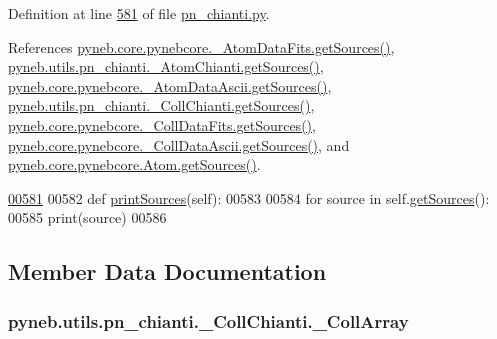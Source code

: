 Definition at line \hyperlink{pn__chianti_8py_source_l00581}{581} of file \hyperlink{pn__chianti_8py_source}{pn\-\_\-chianti.\-py}.



References \hyperlink{pynebcore_8py_source_l00190}{pyneb.\-core.\-pynebcore.\-\_\-\-Atom\-Data\-Fits.\-get\-Sources()}, \hyperlink{pn__chianti_8py_source_l00393}{pyneb.\-utils.\-pn\-\_\-chianti.\-\_\-\-Atom\-Chianti.\-get\-Sources()}, \hyperlink{pynebcore_8py_source_l00460}{pyneb.\-core.\-pynebcore.\-\_\-\-Atom\-Data\-Ascii.\-get\-Sources()}, \hyperlink{pn__chianti_8py_source_l00570}{pyneb.\-utils.\-pn\-\_\-chianti.\-\_\-\-Coll\-Chianti.\-get\-Sources()}, \hyperlink{pynebcore_8py_source_l00690}{pyneb.\-core.\-pynebcore.\-\_\-\-Coll\-Data\-Fits.\-get\-Sources()}, \hyperlink{pynebcore_8py_source_l01022}{pyneb.\-core.\-pynebcore.\-\_\-\-Coll\-Data\-Ascii.\-get\-Sources()}, and \hyperlink{pynebcore_8py_source_l01516}{pyneb.\-core.\-pynebcore.\-Atom.\-get\-Sources()}.


\begin{DoxyCode}
\hypertarget{classpyneb_1_1utils_1_1pn__chianti_1_1___coll_chianti_l00581}{}\hyperlink{classpyneb_1_1utils_1_1pn__chianti_1_1___coll_chianti_ab6061090f17fd6a1122281157459ec7c}{00581} 
00582     \textcolor{keyword}{def }\hyperlink{classpyneb_1_1utils_1_1pn__chianti_1_1___coll_chianti_ab6061090f17fd6a1122281157459ec7c}{printSources}(self):
00583         
00584         \textcolor{keywordflow}{for} source \textcolor{keywordflow}{in} self.\hyperlink{classpyneb_1_1utils_1_1pn__chianti_1_1___coll_chianti_ad4ee6409d1b66c4f0fde4aa9dbf6cca2}{getSources}():
00585             print(source)    
00586         
\end{DoxyCode}


\subsection{Member Data Documentation}
\hypertarget{classpyneb_1_1utils_1_1pn__chianti_1_1___coll_chianti_a5cdf912f3bcbf25bcbbba1ba8fc072d9}{
\subsubsection[{\-\_\-\-Coll\-Array}]{\setlength{\rightskip}{0pt plus 5cm}pyneb.\-utils.\-pn\-\_\-chianti.\-\_\-\-Coll\-Chianti.\-\_\-\-Coll\-Array\hspace{0.3cm}{\ttfamily [private]}}}\label{classpyneb_1_1utils_1_1pn__chianti_1_1___coll_chianti_a5cdf912f3bcbf25bcbbba1ba8fc072d9}


